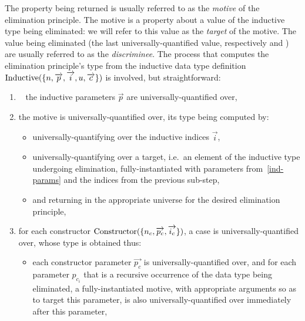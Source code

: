 The property being returned  is usually referred to as the
\textit{motive} of the elimination principle.  The motive is a property about a
value of the inductive type being eliminated: we will refer to this value as the
\textit{target} of the motive.  The value being eliminated (the last
universally-quantified value, respectively  and ) are
usually referred to as the \textit{discriminee}.  The process that computes the
elimination principle's type from the inductive data type definition
$\text{Inductive}(\{ n, \overrightarrow{p}, \overrightarrow{i}, u, \overrightarrow{c} \})$
is involved, but straightforward:

\begin{enumerate}%

\item~\label{ind-params} the inductive parameters $\overrightarrow{p}$ are
universally-quantified over,

\item the motive  is universally-quantified over, its type being
computed by:

\begin{itemize}

\item universally-quantifying over the inductive indices $\overrightarrow{i}$,

\item universally-quantifying over a target, i.e.\ an element of the inductive
type undergoing elimination, fully-instantiated with parameters
from~\ref{ind-params} and the indices from the previous sub-step,

\item and returning in the appropriate universe for the desired elimination
principle,

\end{itemize}

\item for each constructor
$\text{Constructor}(\{ n_c, \overrightarrow{p_c}, \overrightarrow{i_c} \})$, a case is
universally-quantified over, whose type is obtained thus:

\begin{itemize}

\item each constructor parameter $\overrightarrow{p_c}$ is
universally-quantified over, and for each parameter $p_{c_i}$ that is a
recursive occurrence of the data type being eliminated, a fully-instantiated
motive, with appropriate arguments so as to target this parameter, is also
universally-quantified over immediately after this parameter,


\end{itemize}
\end{enumerate}

